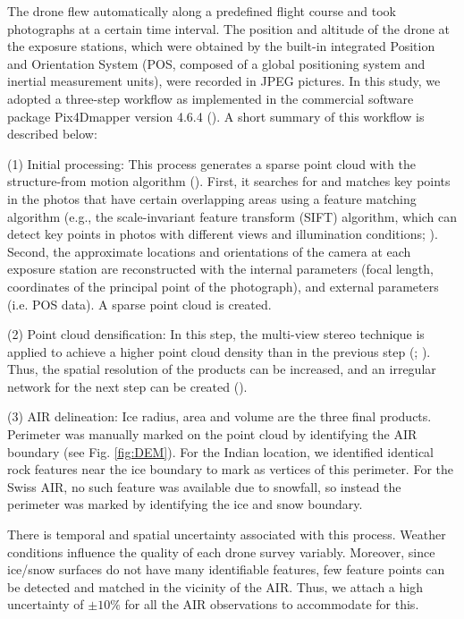 \documentclass[utf8]{frontiersSCNS}
\begin{document}
The drone flew automatically along a predefined flight course and took photographs at a certain time interval. The
position and altitude of the drone at the exposure stations, which were obtained by the built-in integrated
Position and Orientation System (POS, composed of a global positioning system and inertial measurement units),
were recorded in JPEG pictures. In this study, we adopted a three-step workflow as implemented in the
commercial software package Pix4Dmapper version 4.6.4 (\cite{Pix4D}). A short summary of this workflow is
described below:

(1) Initial processing: This process generates a sparse point cloud with the structure-from motion algorithm
(\cite{Turner_2012}). First, it searches for and matches key points in the photos that have certain overlapping
areas using a feature matching algorithm (e.g., the scale-invariant feature transform (SIFT) algorithm, which can
detect key points in photos with different views and illumination conditions; \cite{Lowe_2004}). Second, the
approximate locations and orientations of the camera at each exposure station are reconstructed with the internal
parameters (focal length, coordinates of the principal point of the photograph), and external parameters (i.e. POS
data). A sparse point cloud is created.

(2) Point cloud densification: In this step, the multi-view stereo technique is applied to achieve a higher point
cloud density than in the previous step (\cite{Furukawa_2010}; \cite{Molg_2017}). Thus, the spatial resolution of
the products can be increased, and an irregular network for the next step can be created (\cite{Kung_2011}).

(3) AIR delineation: Ice radius, area and volume are the three final products. Perimeter was manually marked
on the point cloud by identifying the AIR boundary (see Fig. \ref{fig:DEM}). For the Indian location, we identified identical rock features
near the ice boundary to mark as vertices of this perimeter. For the Swiss AIR, no such feature was available due
to snowfall, so instead the perimeter was marked by identifying the ice and snow boundary.

There is temporal and spatial uncertainty associated with this process. Weather conditions influence the quality
of each drone survey variably. Moreover, since ice/snow surfaces do not have many identifiable features, few
feature points can be detected and matched in the vicinity of the AIR. Thus, we attach a high uncertainty of
$\pm 10 \%$ for all the AIR observations to accommodate for this.
\end{document}
